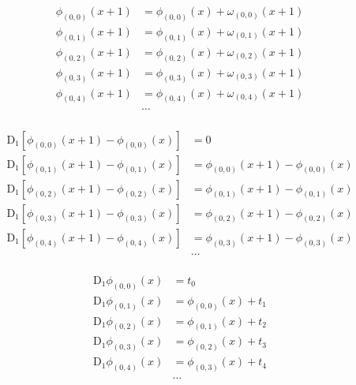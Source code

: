 \begin{equation*} \begin{aligned}
\phi_{(0,0)}(x + 1) &= 
  \phi_{(0,0)}(x) + \omega_{(0,0)}(x + 1)
\\
\phi_{(0,1)}(x + 1) &= 
  \phi_{(0,1)}(x) + \omega_{(0,1)}(x + 1)  
\\
\phi_{(0,2)}(x + 1) &= 
  \phi_{(0,2)}(x) + \omega_{(0,2)}(x + 1)  
\\
\phi_{(0,3)}(x + 1) &= 
  \phi_{(0,3)}(x) + \omega_{(0,3)}(x + 1)  
\\
\phi_{(0,4)}(x + 1) &= 
  \phi_{(0,4)}(x) + \omega_{(0,4)}(x + 1)  
\\
&\ldots \\
\end{aligned} \end{equation*}

\begin{equation*} \begin{aligned}
\mathrm{D}_1 \left[\phi_{(0,0)}(x + 1) - \phi_{(0,0)}(x) \right] &= 0
\\
\mathrm{D}_1 \left[\phi_{(0,1)}(x + 1) - \phi_{(0,1)}(x) \right] &= \phi_{(0,0)}(x + 1) - \phi_{(0,0)}(x)  
\\
\mathrm{D}_1 \left[\phi_{(0,2)}(x + 1) - \phi_{(0,2)}(x) \right] &= \phi_{(0,1)}(x + 1) - \phi_{(0,1)}(x)  
\\
\mathrm{D}_1 \left[\phi_{(0,3)}(x + 1) - \phi_{(0,3)}(x) \right] &= \phi_{(0,2)}(x + 1) - \phi_{(0,2)}(x)  
\\
\mathrm{D}_1 \left[\phi_{(0,4)}(x + 1) - \phi_{(0,4)}(x) \right] &= \phi_{(0,3)}(x + 1) - \phi_{(0,3)}(x)  
\\
&\ldots \\
\end{aligned} \end{equation*}

\begin{equation*} \begin{aligned}
\mathrm{D}_1 \phi_{(0,0)}(x) &= t_0  
\\
\mathrm{D}_1 \phi_{(0,1)}(x) &= \phi_{(0,0)}(x) + t_1  
\\
\mathrm{D}_1 \phi_{(0,2)}(x) &= \phi_{(0,1)}(x) + t_2  
\\
\mathrm{D}_1 \phi_{(0,3)}(x) &= \phi_{(0,2)}(x) + t_3 
\\
\mathrm{D}_1 \phi_{(0,4)}(x) &= \phi_{(0,3)}(x) + t_4 
\\
&\ldots
\\
\end{aligned} \end{equation*}

